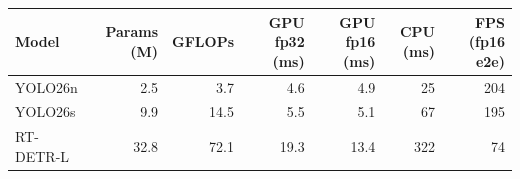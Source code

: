 \begin{tabular}{lrrrrrr}\toprule
Model & Params (M) & GFLOPs & GPU fp32 (ms) & GPU fp16 (ms) & CPU (ms) & FPS (fp16 e2e) \\ \midrule
YOLO26n & 2.5 & 3.7 & 4.6 & 4.9 & 25 & 204 \\
YOLO26s & 9.9 & 14.5 & 5.5 & 5.1 & 67 & 195 \\
RT-DETR-L & 32.8 & 72.1 & 19.3 & 13.4 & 322 & 74 \\
\bottomrule\end{tabular}